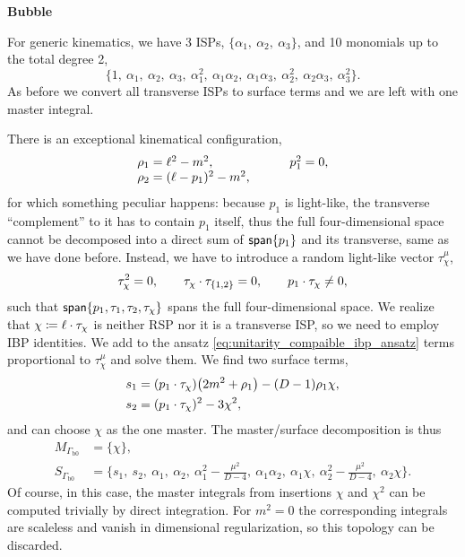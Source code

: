 \textbf{Bubble}

For generic kinematics, we have 3 ISPs, $\{\alpha_1,~\alpha_2,~\alpha_3\}$, and
10 monomials up to the total degree 2,
\[
  \{1,~\alpha_1,~\alpha_2,~\alpha_3,~\alpha_1^2,~\alpha_1\alpha_2,~\alpha_1\alpha_3,~\alpha_2^2,~\alpha_2\alpha_3,~ \alpha_3^2\}.
\]
As before we convert all transverse ISPs to surface terms and we are left with one master integral.

There is an exceptional kinematical configuration,
\begin{equation*}
  \begin{tabular}{ll}
    $\rho_1 = \ell^2-m^2$,               &  \qquad $p_1^2=0$,\\
    $\rho_2 = (\ell-p_1)^2-m^2$,         &  \\
  \end{tabular}
\end{equation*}
for which something peculiar happens:
because $p_1$ is light-like, the transverse ``complement'' to it has to contain $p_1$ itself, thus the full four-dimensional space
cannot be decomposed into a direct sum of $\mathsf{span}\{p_1\}$ and its transverse, same as we have done before.
Instead, we have to introduce a random light-like vector $\tau_\chi^\mu$,
\[
  \tau_\chi^2=0, \qquad \sp(\tau_\chi,\tau_{\{1,2\}}) = 0, \qquad  \sp(p_1,\tau_\chi) \neq 0,
\]
such that $\mathsf{span}\{p_1,\tau_1,\tau_2,\tau_\chi\}$ spans the full four-dimensional space.
We realize that $\chi \coloneqq \sp(\ell,\tau_\chi)$ is neither RSP nor it is a transverse ISP, so 
we need to employ IBP identities.
We add to the ansatz \eqref{eq:unitarity_compaible_ibp_ansatz} terms proportional to $\tau_\chi^\mu$ and solve them.
We find two surface terms,
\begin{align*}
  s_1 &= (\sp(p_1,\tau_\chi)) \qty(2 m^2 + \rho_1) - (D-1)\rho_1\chi, \\
  s_2 &= (\sp(p_1,\tau_\chi))^2 - 3 \chi^2,
\end{align*}
and can choose $\chi$ as the one master. The master/surface decomposition is thus
\begin{align*}
  M_{\Gamma_\text{b0} } &= \{\chi\}, \\
   S_{\Gamma_\text{b0} } &= 
  \{s_1,~s_2,~\alpha_1,~\alpha_2,~\alpha_1^2 - \frac{\mu^2}{D-4},~\alpha_1\alpha_2,~ \alpha_1\chi,~\alpha_2^2-\frac{\mu^2}{D-4},~\alpha_2\chi \}.
\end{align*}
Of course, in this case, the master integrals from insertions $\chi$ and $\chi^2$ can be computed trivially by direct integration.
For $m^2=0$ the corresponding integrals are scaleless and vanish in dimensional regularization,
so this topology can be discarded.

